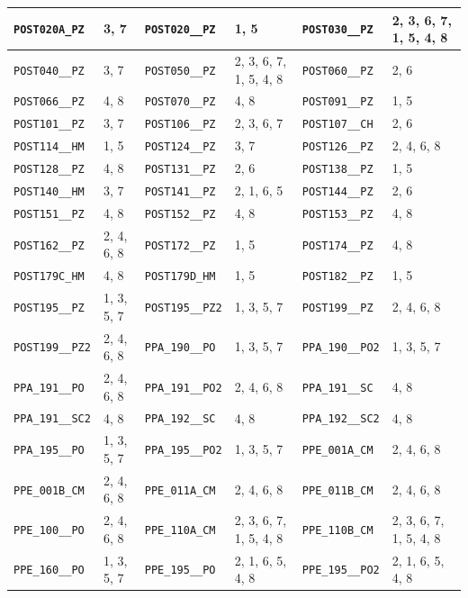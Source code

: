 \begin{longtable}{|l|l||l|l||l|l|}
    \verb|POST020A_PZ| & 3, 7 & \verb|POST020__PZ| & 1, 5 & \verb|POST030__PZ| & 2, 3, 6, 7, 1, 5, 4, 8\\\hline
    \verb|POST040__PZ| & 3, 7 & \verb|POST050__PZ| & 2, 3, 6, 7, 1, 5, 4, 8 & \verb|POST060__PZ| & 2, 6\\\hline
    \verb|POST066__PZ| & 4, 8 & \verb|POST070__PZ| & 4, 8 & \verb|POST091__PZ| & 1, 5\\\hline
    \verb|POST101__PZ| & 3, 7 & \verb|POST106__PZ| & 2, 3, 6, 7 & \verb|POST107__CH| & 2, 6\\\hline
    \verb|POST114__HM| & 1, 5 & \verb|POST124__PZ| & 3, 7 & \verb|POST126__PZ| & 2, 4, 6, 8\\\hline
    \verb|POST128__PZ| & 4, 8 & \verb|POST131__PZ| & 2, 6 & \verb|POST138__PZ| & 1, 5\\\hline
    \verb|POST140__HM| & 3, 7 & \verb|POST141__PZ| & 2, 1, 6, 5 & \verb|POST144__PZ| & 2, 6\\\hline
    \verb|POST151__PZ| & 4, 8 & \verb|POST152__PZ| & 4, 8 & \verb|POST153__PZ| & 4, 8\\\hline
    \verb|POST162__PZ| & 2, 4, 6, 8 & \verb|POST172__PZ| & 1, 5 & \verb|POST174__PZ| & 4, 8\\\hline
    \verb|POST179C_HM| & 4, 8 & \verb|POST179D_HM| & 1, 5 & \verb|POST182__PZ| & 1, 5\\\hline
    \verb|POST195__PZ| & 1, 3, 5, 7 & \verb|POST195__PZ2| & 1, 3, 5, 7 & \verb|POST199__PZ| & 2, 4, 6, 8\\\hline
    \verb|POST199__PZ2| & 2, 4, 6, 8 & \verb|PPA_190__PO| & 1, 3, 5, 7 & \verb|PPA_190__PO2| & 1, 3, 5, 7\\\hline
    \verb|PPA_191__PO| & 2, 4, 6, 8 & \verb|PPA_191__PO2| & 2, 4, 6, 8 & \verb|PPA_191__SC| & 4, 8\\\hline
    \verb|PPA_191__SC2| & 4, 8 & \verb|PPA_192__SC| & 4, 8 & \verb|PPA_192__SC2| & 4, 8\\\hline
    \verb|PPA_195__PO| & 1, 3, 5, 7 & \verb|PPA_195__PO2| & 1, 3, 5, 7 & \verb|PPE_001A_CM| & 2, 4, 6, 8\\\hline
    \verb|PPE_001B_CM| & 2, 4, 6, 8 & \verb|PPE_011A_CM| & 2, 4, 6, 8 & \verb|PPE_011B_CM| & 2, 4, 6, 8\\\hline
    \verb|PPE_100__PO| & 2, 4, 6, 8 & \verb|PPE_110A_CM| & 2, 3, 6, 7, 1, 5, 4, 8 & \verb|PPE_110B_CM| & 2, 3, 6, 7, 1, 5, 4, 8\\\hline
    \verb|PPE_160__PO| & 1, 3, 5, 7 & \verb|PPE_195__PO| & 2, 1, 6, 5, 4, 8 & \verb|PPE_195__PO2| & 2, 1, 6, 5, 4, 8\\\hline

\end{longtable}
